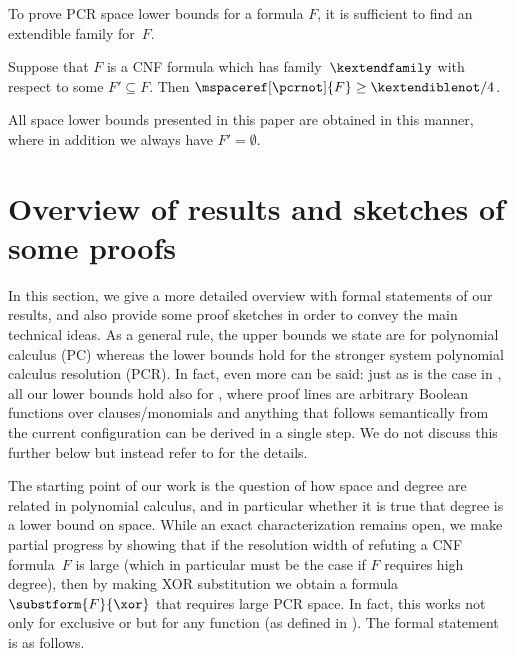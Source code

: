 To prove PCR space lower bounds for a formula $F$, it is sufficient to
find an extendible family for~$F$.

\begin{theorem}
  \label{th:space-lower-bound}
Suppose that $F$ is a CNF formula which has \akextendible
  family~$\kextendfamily$
  with respect to some $F'\subseteq F$. Then
  $\mspaceref[\pcrnot]{F}\geq \kextendiblenot/4$.
\end{theorem}

All space lower bounds presented in this paper are obtained in this
  manner, where in addition we always have
  $F' = \emptyset$.
 
%
\section{Overview of results and sketches of some proofs}
\label{sec:overview-results}

In this section, we give
%
a more detailed overview with formal statements of our
results, and also provide some proof sketches in order to convey the
main technical ideas.
As a general rule, the upper bounds we state are for polynomial
  calculus (PC) whereas the lower bounds hold for the stronger system
  polynomial calculus resolution (PCR).
  In fact, even more can be said: just as is the case in
  \cite{ABRW02SpaceComplexity,FLNRT15SpaceCplx,BG15Framework},
  all our lower bounds
  hold also for
  ,
  where proof lines are arbitrary Boolean functions over
  clauses/monomials and anything that follows semantically from the
  current configuration can be derived in a single step. We do not
  discuss this further below but instead refer to
  for the details.


\label{sec:width-monomialspace}

The starting point of our work is the question of how space and degree
are related in polynomial calculus, and in particular whether it is
true that degree %
%
%
is a lower bound on space.  %
%
%
While an exact characterization remains
open, we make partial progress by showing that if the resolution width
of refuting a CNF formula~$F$ is large (which in particular must be
the case if $F$ requires high degree), then by making XOR
substitution we obtain a formula
$\substform{F}{\xor}$
that requires
large PCR space.
In fact, this works not only for exclusive or but for any
\nonauthor function
(as defined in ).
The formal statement
%
is as follows.


